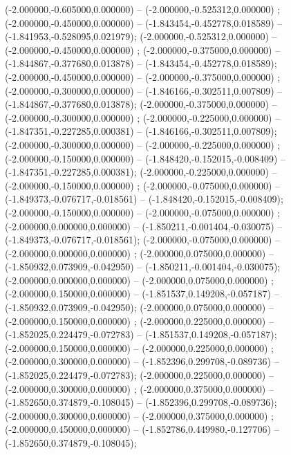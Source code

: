  (-2.000000,-0.605000,0.000000) -- (-2.000000,-0.525312,0.000000) ;
 (-2.000000,-0.450000,0.000000) -- (-1.843454,-0.452778,0.018589) -- (-1.841953,-0.528095,0.021979);
 (-2.000000,-0.525312,0.000000) -- (-2.000000,-0.450000,0.000000) ;
 (-2.000000,-0.375000,0.000000) -- (-1.844867,-0.377680,0.013878) -- (-1.843454,-0.452778,0.018589);
 (-2.000000,-0.450000,0.000000) -- (-2.000000,-0.375000,0.000000) ;
 (-2.000000,-0.300000,0.000000) -- (-1.846166,-0.302511,0.007809) -- (-1.844867,-0.377680,0.013878);
 (-2.000000,-0.375000,0.000000) -- (-2.000000,-0.300000,0.000000) ;
 (-2.000000,-0.225000,0.000000) -- (-1.847351,-0.227285,0.000381) -- (-1.846166,-0.302511,0.007809);
 (-2.000000,-0.300000,0.000000) -- (-2.000000,-0.225000,0.000000) ;
 (-2.000000,-0.150000,0.000000) -- (-1.848420,-0.152015,-0.008409) -- (-1.847351,-0.227285,0.000381);
 (-2.000000,-0.225000,0.000000) -- (-2.000000,-0.150000,0.000000) ;
 (-2.000000,-0.075000,0.000000) -- (-1.849373,-0.076717,-0.018561) -- (-1.848420,-0.152015,-0.008409);
 (-2.000000,-0.150000,0.000000) -- (-2.000000,-0.075000,0.000000) ;
 (-2.000000,0.000000,0.000000) -- (-1.850211,-0.001404,-0.030075) -- (-1.849373,-0.076717,-0.018561);
 (-2.000000,-0.075000,0.000000) -- (-2.000000,0.000000,0.000000) ;
 (-2.000000,0.075000,0.000000) -- (-1.850932,0.073909,-0.042950) -- (-1.850211,-0.001404,-0.030075);
 (-2.000000,0.000000,0.000000) -- (-2.000000,0.075000,0.000000) ;
 (-2.000000,0.150000,0.000000) -- (-1.851537,0.149208,-0.057187) -- (-1.850932,0.073909,-0.042950);
 (-2.000000,0.075000,0.000000) -- (-2.000000,0.150000,0.000000) ;
 (-2.000000,0.225000,0.000000) -- (-1.852025,0.224479,-0.072783) -- (-1.851537,0.149208,-0.057187);
 (-2.000000,0.150000,0.000000) -- (-2.000000,0.225000,0.000000) ;
 (-2.000000,0.300000,0.000000) -- (-1.852396,0.299708,-0.089736) -- (-1.852025,0.224479,-0.072783);
 (-2.000000,0.225000,0.000000) -- (-2.000000,0.300000,0.000000) ;
 (-2.000000,0.375000,0.000000) -- (-1.852650,0.374879,-0.108045) -- (-1.852396,0.299708,-0.089736);
 (-2.000000,0.300000,0.000000) -- (-2.000000,0.375000,0.000000) ;
 (-2.000000,0.450000,0.000000) -- (-1.852786,0.449980,-0.127706) -- (-1.852650,0.374879,-0.108045);
